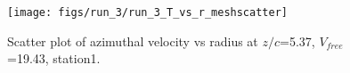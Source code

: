 \begin{figure}[H]
\centering
\texttt{[image: figs/run\_3/run\_3\_T\_vs\_r\_meshscatter]}
\caption{Scatter plot of azimuthal velocity vs radius at $z/c$=5.37, $V_{free}$=19.43, station1.}
\label{fig:run_3_T_vs_r_meshscatter}
\end{figure}


